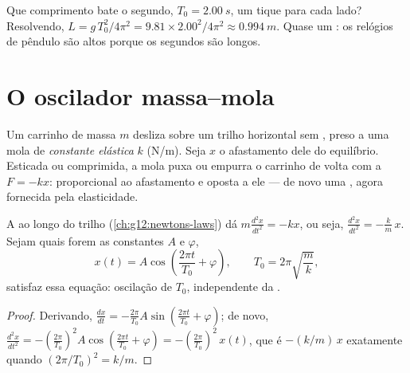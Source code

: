 \begin{example}\label{ex:g12:oscillators-and-time:seconds}
Que comprimento bate o segundo, $T_0 = \qty{2.00}{s}$, um tique para cada lado?
Resolvendo, $L = g\,T_0^2/4\pi^2 = 9.81 \times 2.00^2/4\pi^2 \approx \qty{0.994}{m}$.
Quase um : os relógios de pêndulo são altos porque os segundos são longos.
\end{example}

\section{O oscilador massa--mola}

\begin{definition}\label{def:g12:oscillators-and-time:spring}
Um carrinho de massa $m$ desliza sobre um trilho horizontal sem , preso a uma
mola de \emph{constante elástica} $k$ (\unit{N/m}). Seja $x$
o afastamento dele do equilíbrio. Esticada ou comprimida, a mola puxa ou empurra o
carrinho de volta com a  $F = -kx$: proporcional ao afastamento e oposta a ele ---
de novo uma , agora fornecida pela elasticidade.
\end{definition}

\begin{proposition}\label{prop:g12:oscillators-and-time:spring-period}
A  ao longo do trilho (\cref{ch:g12:newtons-laws}) dá
$m \frac{d^2x}{dt^2} = -kx$, ou seja, $\frac{d^2x}{dt^2} = -\frac{k}{m}\,x$. Sejam
quais forem as constantes $A$ e $\varphi$,
\[
x(t) = A \cos\!\left(\frac{2\pi t}{T_0} + \varphi\right),
\qquad T_0 = 2\pi\sqrt{\frac{m}{k}},
\]
satisfaz essa equação: oscilação de  $T_0$, independente da .
\end{proposition}

\begin{proof}
Derivando, $\frac{dx}{dt} = -\frac{2\pi}{T_0}A \sin(\frac{2\pi t}{T_0} + \varphi)$; de
novo, $\frac{d^2x}{dt^2} = -(\frac{2\pi}{T_0})^2 A\cos(\frac{2\pi t}{T_0} + \varphi) =
-(\frac{2\pi}{T_0})^2\,x(t)$, que é $-(k/m)\,x$ exatamente quando
$(2\pi/T_0)^2 = k/m$.
\end{proof}

